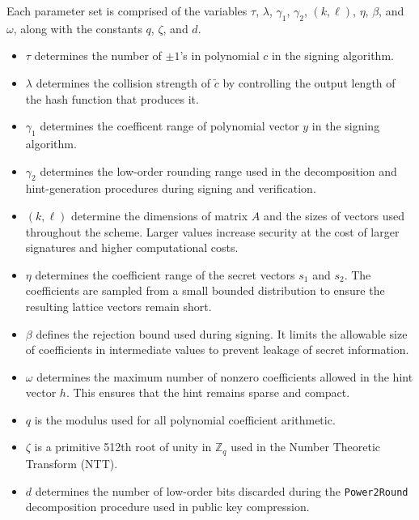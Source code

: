 Each parameter set is comprised of the variables $\tau$, $\lambda$, $\gamma_1$, $\gamma_2$, $(k, \ell)$, $\eta$, $\beta$, and $\omega$, along with the constants $q$, $\zeta$, and $d$.
\begin{itemize}
\item $\tau$ determines the number of $\pm1$'s in polynomial $c$ in the signing algorithm.
\item $\lambda$ determines the collision strength of $\tilde{c}$ by controlling the output length of the hash function that produces it.
\item $\gamma_1$ determines the coefficent range of polynomial vector $y$ in the signing algorithm. 
\item $\gamma_2$ determines the low-order rounding range used in the decomposition and hint-generation procedures during signing and verification.
\item $(k,\ell)$ determine the dimensions of matrix $A$ and the sizes of vectors used throughout the scheme. Larger values increase security at the cost of larger signatures and higher computational costs.
\item $\eta$ determines the coefficient range of the secret vectors $s_1$ and $s_2$. The coefficients are sampled from a small bounded distribution to ensure the resulting lattice vectors remain short.
\item $\beta$ defines the rejection bound used during signing. It limits the allowable size of coefficients in intermediate values to prevent leakage of secret information.
\item $\omega$ determines the maximum number of nonzero coefficients allowed in the hint vector $h$. This ensures that the hint remains sparse and compact.
\item $q$ is the modulus used for all polynomial coefficient arithmetic.
\item $\zeta$ is a primitive 512th root of unity in $\mathbb{Z}_q$ used in the Number Theoretic Transform (NTT).
\item $d$ determines the number of low-order bits discarded during the \texttt{Power2Round} decomposition procedure used in public key compression.
\end{itemize}

